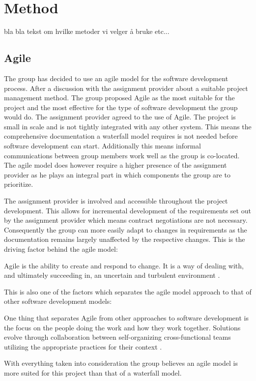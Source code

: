 \section{Method}
bla bla tekst om hvilke metoder vi velger å bruke etc...

\subsection{Agile}
The group has decided to use an agile model for the software development process. After a discussion with the assignment provider about a suitable project management method. The group proposed Agile as the most suitable for the project and the most effective for the type of software development the group would do. The assignment provider agreed to the use of Agile.  
The project is small in scale and is not tightly integrated with any other system. This means the comprehensive documentation a waterfall model requires is not needed before software development can start.  Additionally this means informal communications between group members work well as the group is co-located.
The agile model does however require a higher presence of the assignment provider as he plays an integral part in which components the group are to prioritize.

The assignment provider is involved and accessible throughout the project development.
This allows for incremental development of the requirements set out by the assignment provider which means contract negotiations are not necessary.
Consequently the group can more easily adapt to changes in requirements as the documentation remains largely unaffected by the respective changes.
This is the driving factor behind the agile model:
\begin{displayquote}
Agile is the ability to create and respond to change.
It is a way of dealing with, and ultimately succeeding in, an uncertain and turbulent environment \cite{what-is-agile}.
\end{displayquote}
This is also one of the factors which separates the agile model approach to that of other software development models:

\begin{displayquote}
One thing that separates Agile from other approaches to software development is the focus on the people doing the work and how they work together.
Solutions evolve through collaboration between self-organizing cross-functional teams utilizing the appropriate practices for their context \cite{what-is-agile-software-development}.
\end{displayquote}
With everything taken into consideration the group believes an agile model is more suited for this project than that of a waterfall model.

